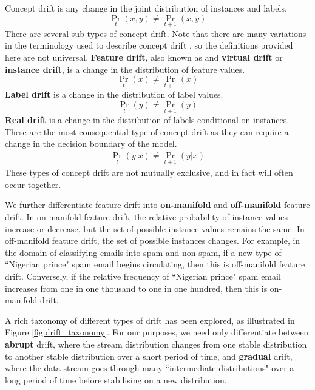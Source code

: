 
Concept drift is any change in the joint distribution of instances and labels.
\begin{equation}
    \Pr_t(x,y) \ne \Pr_{t+1}(x,y) 
\end{equation}
There are several sub-types of concept drift. Note that there are many variations in the terminology used to describe concept drift \cite{dataset_drift}\cite{characterizing_drift}, so the definitions provided here are not universal. {\bf Feature drift},  also known as and {\bf virtual drift} or {\bf instance drift}, is a change in the distribution of feature values. 
\begin{equation}
    \Pr_t(x) \ne \Pr_{t+1}(x) 
\end{equation}
{\bf Label drift} is a change in the distribution of label values.
\begin{equation}
    \Pr_t(y) \ne \Pr_{t+1}(y) 
\end{equation}
{\bf Real drift} is a change in the distribution of labels conditional on instances. These are the most consequential type of concept drift as they can require a change in the decision boundary of the model.
\begin{align}
    \Pr_t(y|x) \ne \Pr_{t+1}(y|x)
\end{align}
These types of concept drift are not mutually exclusive, and in fact will often occur together. 

We further differentiate feature drift into {\bf on-manifold} and {\bf off-manifold} feature drift. In on-manifold feature drift, the relative probability of instance values increase or decrease, but the set of possible instance values remains the same. In off-manifold feature drift, the set of possible instances changes. For example, in the domain of classifying emails into spam and non-spam, if a new type of ``Nigerian prince" spam email begins circulating, then this is off-manifold feature drift. Conversely, if the relative frequency of ``Nigerian prince" spam email increases from one in one thousand to one in one hundred, then this is on-manifold drift. 

A rich taxonomy of different types of drift has been explored, as illustrated in Figure \ref{fig:drift_taxonomy}. For our purposes, we need only differentiate between {\bf abrupt} drift, where the stream distribution changes from one stable distribution to another stable distribution over a short period of time, and {\bf gradual} drift, where the data stream goes through many ``intermediate distributions" over a long period of time before stabilising on a new distribution.

